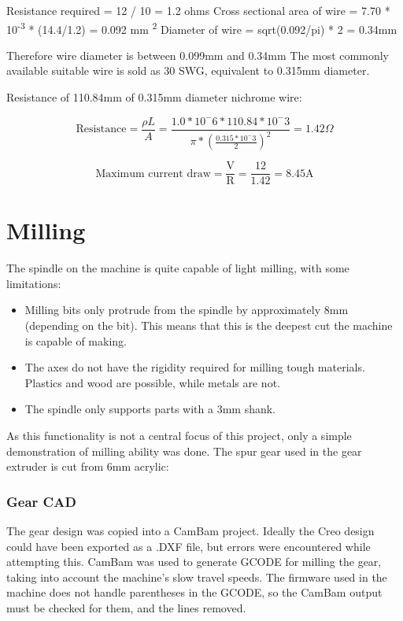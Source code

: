 \documentclass[a4paper,11pt]{article}  %
\begin{document}
Resistance required = 12 / 10 = 1.2 ohms
Cross sectional area of wire = 7.70 * 10\textsuperscript{-3} * (14.4/1.2) = 0.092 mm \textsuperscript{2}
Diameter of wire = sqrt(0.092/pi) * 2 = 0.34mm

Therefore wire diameter is between 0.099mm and 0.34mm
The most commonly available suitable wire is sold as 30 SWG, equivalent to 0.315mm diameter.

Resistance of 110.84mm of 0.315mm diameter nichrome wire:

\begin{displaymath}
\text{Resistance} = \frac{\rho L}{A}
= \frac{1.0*10^-6*110.84*10^-3}{\pi*(\frac{0.315*10^-3}{2})^2}
= 1.42 \Omega
\end{displaymath}



\begin{displaymath}
\text{Maximum current draw} = \frac{\text{V}}{\text{R}}
= \frac{12}{1.42}
= 8.45 \text{A}
\end{displaymath}

\section{Milling}
The spindle on the machine is quite capable of light milling, with some limitations:

\begin{itemize} \itemsep0em
	\item	Milling bits only protrude from the spindle by approximately 8mm (depending on the bit). This means that this is the deepest cut the machine is capable of making.
	\item	The axes do not have the rigidity required for milling tough materials. Plastics and wood are possible, while metals are not.
	\item	The spindle only supports parts with a 3mm shank.
\end{itemize}

As this functionality is not a central focus of this project, only a simple demonstration of milling ability was done. The spur gear used in the gear extruder is cut from 6mm acrylic:

\subsubsection {Gear CAD}
The gear design was copied into a CamBam project. Ideally the Creo design could have been exported as a .DXF file, but errors were encountered while attempting this. CamBam was used to 
generate GCODE for milling the gear, taking into account the machine's slow travel speeds. The firmware used in the machine does not handle parentheses in the GCODE, so the CamBam 
output must be checked for them, and the lines removed.
\end{document}
